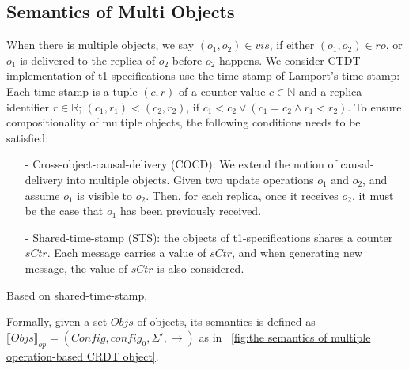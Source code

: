 





\subsection{Semantics of Multi Objects}
\label{subsec:semantics of multi objects}

When there is multiple objects, we say $(o_1,o_2) \in \mathit{vis}$, if either $(o_1,o_2) \in \mathit{ro}$, or $o_1$ is delivered to the replica of $o_2$ before $o_2$ happens. We consider CTDT implementation of t1-specifications use the time-stamp of Lamport's time-stamp: Each time-stamp is a tuple $(c,r)$ of a counter value $c \in \mathbb{N}$ and a replica identifier $r \in \mathbb{R}$; $(c_1,r_1) < (c_2,r_2)$, if $c_1 < c_2 \vee (c_1 = c_2 \wedge r_1 < r_2)$. To ensure compositionality of multiple objects, the following conditions needs to be satisfied:

\begin{itemize}
\setlength{\itemsep}{0.5pt}
\item[-] Cross-object-causal-delivery (COCD): We extend the notion of causal-delivery into multiple objects. Given two update operations $o_1$ and $o_2$, and assume $o_1$ is visible to $o_2$. Then, for each replica, once it receives $o_2$, it must be the case that $o_1$ has been previously received.

\item[-] Shared-time-stamp (STS): the objects of t1-specifications shares a counter $\mathit{sCtr}$. Each message carries a value of $\mathit{sCtr}$, and when generating new message, the value of $\mathit{sCtr}$ is also considered.
\end{itemize}



Based on shared-time-stamp,



Formally, given a set $\mathit{Objs}$ of objects, its semantics is defined as $\llbracket \mathit{Objs} \rrbracket_{\mathit{op}} = (\mathit{Config},\mathit{config}_0,\Sigma',\rightarrow)$ as in \figurename~\ref{fig:the semantics of multiple operation-based CRDT object}.


